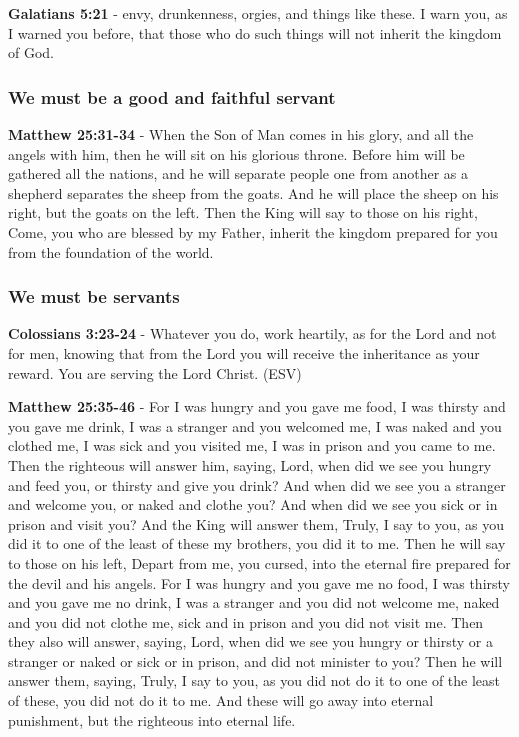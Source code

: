 \documentclass[11pt]{article}
\begin{document}
\textbf{Galatians 5:21} - envy, drunkenness, orgies, and things like these. I warn you, as I warned you before, that those who do such things will not inherit the kingdom of God.

\subsubsection{We must be a good and faithful servant}
\label{sec:org84179e0}
\textbf{Matthew 25:31-34} - When the Son of Man comes in his glory, and all the angels with him, then he will sit on his glorious throne. Before him will be gathered all the nations, and he will separate people one from another as a shepherd separates the sheep from the goats. And he will place the sheep on his right, but the goats on the left. Then the King will say to those on his right, Come, you who are blessed by my Father, inherit the kingdom prepared for you from the foundation of the world.

\subsubsection{We must be servants}
\label{sec:org5994e22}
\textbf{Colossians 3:23-24} -  Whatever you do, work heartily, as for the Lord and not for men, knowing that from the Lord you will receive the inheritance as your reward. You are serving the Lord Christ.  (ESV)

\textbf{Matthew 25:35-46} - For I was hungry and you gave me food, I was thirsty and you gave me drink, I was a stranger and you welcomed me, I was naked and you clothed me, I was sick and you visited me, I was in prison and you came to me. Then the righteous will answer him, saying, Lord, when did we see you hungry and feed you, or thirsty and give you drink? And when did we see you a stranger and welcome you, or naked and clothe you? And when did we see you sick or in prison and visit you? And the King will answer them, Truly, I say to you, as you did it to one of the least of these my brothers, you did it to me. Then he will say to those on his left, Depart from me, you cursed, into the eternal fire prepared for the devil and his angels. For I was hungry and you gave me no food, I was thirsty and you gave me no drink, I was a stranger and you did not welcome me, naked and you did not clothe me, sick and in prison and you did not visit me. Then they also will answer, saying, Lord, when did we see you hungry or thirsty or a stranger or naked or sick or in prison, and did not minister to you? Then he will answer them, saying, Truly, I say to you, as you did not do it to one of the least of these, you did not do it to me. And these will go away into eternal punishment, but the righteous into eternal life.
\end{document}
